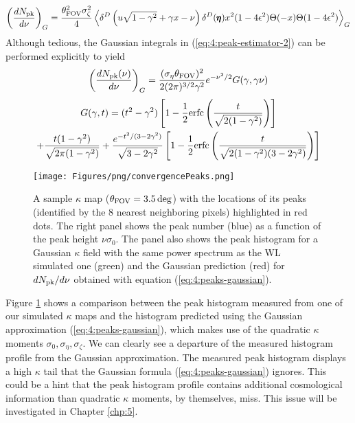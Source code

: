 \begin{equation}
\label{eq:4:peak-estimator-2}
\left(\frac{dN_{\rm pk}}{d\nu}\right)_G = \frac{\theta^2_{\rm FOV}\sigma^2_\zeta}{4}\left\langle\delta^D\left(u\sqrt{1-\gamma^2}+\gamma x-\nu\right)\delta^D(\pmb{\eta})x^2(1-4\epsilon^2)\Theta(-x)\Theta(1-4\epsilon^2)\right\rangle_G
\end{equation}
%
Although tedious, the Gaussian integrals in (\ref{eq:4:peak-estimator-2}) can be performed explicitly \citep{BondCMB} to yield
%
\begin{equation}
\label{eq:4:peaks-gaussian}
\left(\frac{dN_{\rm pk}(\nu)}{d\nu}\right)_G = \frac{(\sigma_\eta\theta_{\rm FOV})^2}{2(2\pi)^{3/2} \gamma^2}e^{-\nu^2/2}G(\gamma,\gamma\nu)
\end{equation}
%
\begin{equation}
\label{eq:4:Gdef}
\begin{gathered}
G(\gamma,t) = (t^2-\gamma^2)\left[1-\frac{1}{2}{\rm erfc}\left(\frac{t}{\sqrt{2(1-\gamma^2)}}\right)\right] \\
+ \frac{t(1-\gamma^2)}{\sqrt{2\pi(1-\gamma^2)}} + \frac{e^{-t^2/(3-2\gamma^2)}}{\sqrt{3-2\gamma^2}}\left[1-\frac{1}{2}{\rm erfc}\left(\frac{t}{\sqrt{2(1-\gamma^2)(3-2\gamma^2)}}\right)\right]
\end{gathered}
\end{equation}
%
\begin{figure}
\begin{center}
\texttt{[image: Figures/png/convergencePeaks.png]}
\end{center}
\caption{A sample $\kappa$ map ($\theta_{\rm FOV}=3.5\,{\rm deg}$) with the locations of its peaks (identified by the 8 nearest neighboring pixels) highlighted in red dots. The right panel shows the peak number (blue) as a function of the peak height $\nu\sigma_0$. The panel also shows the peak histogram for a Gaussian $\kappa$ field with the same power spectrum as the WL simulated one (green) and the Gaussian prediction (red) for $dN_{\rm pk}/d\nu$ obtained with equation (\ref{eq:4:peaks-gaussian}).}
\label{fig:4:peaks}
\end{figure}
%
Figure \ref{fig:4:peaks} shows a comparison between the peak histogram measured from one of our simulated $\kappa$ maps and the histogram predicted using the Gaussian approximation (\ref{eq:4:peaks-gaussian}), which makes use of the quadratic $\kappa$ moments $\sigma_0,\sigma_\eta,\sigma_\zeta$. We can clearly see a departure of the measured histogram profile from the Gaussian approximation. The measured peak histogram displays a high $\kappa$ tail that the Gaussian formula (\ref{eq:4:peaks-gaussian}) ignores. This could be a hint that the peak histogram profile contains additional cosmological information than quadratic $\kappa$ moments, by themselves, miss. This issue will be investigated in Chapter \ref{chp:5}.    

